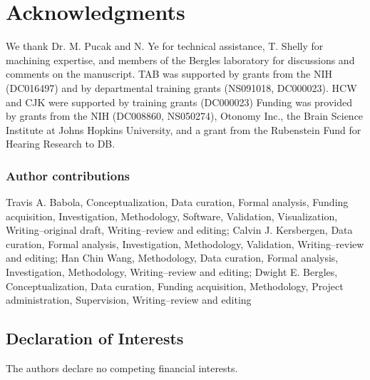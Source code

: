 \documentclass[9pt,lineno]{elife}
\begin{document}
\section{Acknowledgments}

We thank Dr. M. Pucak and N. Ye for technical assistance, T. Shelly for machining expertise, and members of the Bergles laboratory for discussions and comments on the manuscript. TAB was supported by grants from the NIH (DC016497) and by departmental training grants (NS091018, DC000023). HCW and CJK were supported by training grants (DC000023) Funding was provided by grants from the NIH (DC008860, NS050274), Otonomy Inc., the Brain Science Institute at Johns Hopkins University, and a grant from the Rubenstein Fund for Hearing Research to DB. 

\subsubsection{Author contributions}
Travis A. Babola, Conceptualization, Data curation, Formal analysis, Funding acquisition, Investigation, Methodology, Software, Validation, Visualization, Writing--original draft, Writing--review and editing; Calvin J. Kersbergen, Data curation, Formal analysis, Investigation, Methodology, Validation, Writing--review and editing;
Han Chin Wang, Methodology, Data curation, Formal analysis, Investigation, Methodology, Writing--review and editing;
Dwight E. Bergles, Conceptualization, Data curation, Funding acquisition, Methodology, Project administration, Supervision, Writing--review and editing

\subsection{Declaration of Interests}
The authors declare no competing financial interests. 


\end{document}
